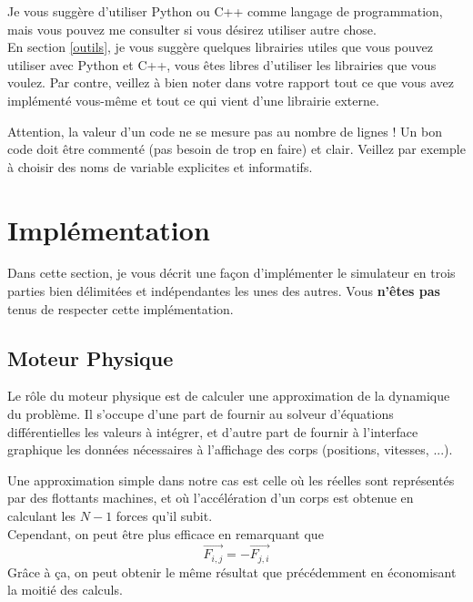 \documentclass{article}
\begin{document}
\vspace{1em}

\noindent Je vous suggère d'utiliser Python ou C++ comme langage de programmation, mais vous pouvez me consulter si vous désirez utiliser autre chose. \\
En section \ref{outils}, je vous suggère quelques librairies utiles que vous pouvez utiliser avec Python et C++, vous êtes libres d'utiliser les librairies que vous voulez. Par contre, veillez à bien noter dans votre rapport tout ce que vous avez implémenté vous-même et tout ce qui vient d'une librairie externe.

Attention, la valeur d'un code ne se mesure pas au nombre de lignes ! Un bon code doit être commenté (pas besoin de trop en faire) et clair. Veillez par exemple à choisir des noms de variable explicites et informatifs.

\pagebreak

\section{Implémentation}

Dans cette section, je vous décrit une façon d'implémenter le simulateur en trois parties bien délimitées et indépendantes les unes des autres. Vous \textbf{n'êtes pas} tenus de respecter cette implémentation.

\subsection{Moteur Physique}
\label{moteurphysique}

Le rôle du moteur physique est de calculer une approximation de la dynamique du problème. Il s'occupe d'une part de fournir au solveur d'équations différentielles les valeurs à intégrer, et d'autre part de fournir à l'interface graphique les données nécessaires à l'affichage des corps (positions, vitesses, ...).

Une approximation simple dans notre cas est celle où les réelles sont représentés par des flottants machines, et où l'accélération d'un corps est obtenue en calculant les $N-1$ forces qu'il subit.\\
Cependant, on peut être plus efficace en remarquant que
\begin{equation}
    \overrightarrow{F_{i,j}} = - \overrightarrow{F_{j,i}}
\end{equation}
Grâce à ça, on peut obtenir le même résultat que précédemment en économisant la moitié des calculs.
\end{document}
